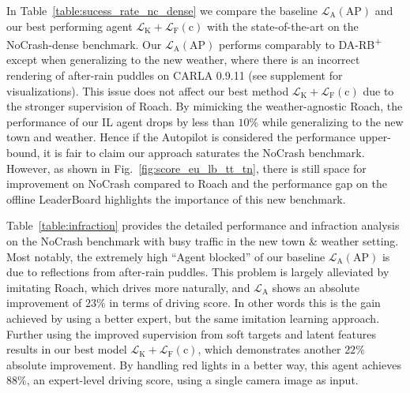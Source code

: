 \vspace{1ex}
In Table~\ref{table:sucess_rate_nc_dense} we compare the baseline $\mathcal{L}_\text{A}(\text{AP})$ and our best performing agent $\mathcal{L}_\text{K}+\mathcal{L}_\text{F}(\text{c})$ with the state-of-the-art on the NoCrash-dense benchmark.
Our $\mathcal{L}_\text{A}(\text{AP})$ performs comparably to DA-RB\textsuperscript{+} except when generalizing to the new weather, where there is an incorrect rendering of after-rain puddles on CARLA 0.9.11 (see supplement for visualizations).%
This issue does not affect our best method $\mathcal{L}_\text{K}+\mathcal{L}_\text{F}(\text{c})$ due to the stronger supervision of Roach. 
By mimicking the weather-agnostic Roach, the performance of our IL agent drops by less than $10\%$ while generalizing to the new town and weather.
Hence if the Autopilot is considered the performance upper-bound, it is fair to claim our approach saturates the NoCrash benchmark.
However, as shown in Fig.~\ref{fig:score_eu_lb_tt_tn}, there is still space for improvement on NoCrash compared to Roach and the performance gap on the offline LeaderBoard highlights the importance of this new benchmark.

\vspace{1ex}
Table~\ref{table:infraction} provides the detailed performance and infraction analysis on the NoCrash benchmark with busy traffic in the new town \& weather setting.
Most notably, the extremely high ``Agent blocked'' of our baseline $\mathcal{L}_\text{A}(\text{AP})$ is due to reflections from after-rain puddles.
This problem is largely alleviated by imitating Roach, which drives more naturally, and $\mathcal{L}_\text{A}$ shows an absolute improvement of $23\%$ in terms of driving score.
In other words this is the gain achieved by using a better expert, but the same imitation learning approach. 
Further using the improved supervision from soft targets and latent features results in our best model $\mathcal{L}_\text{K}+\mathcal{L}_\text{F}(\text{c})$, which demonstrates another $22\%$ absolute improvement.
By handling red lights in a better way, this agent achieves $88\%$, an expert-level driving score, using a single camera image as input.



 